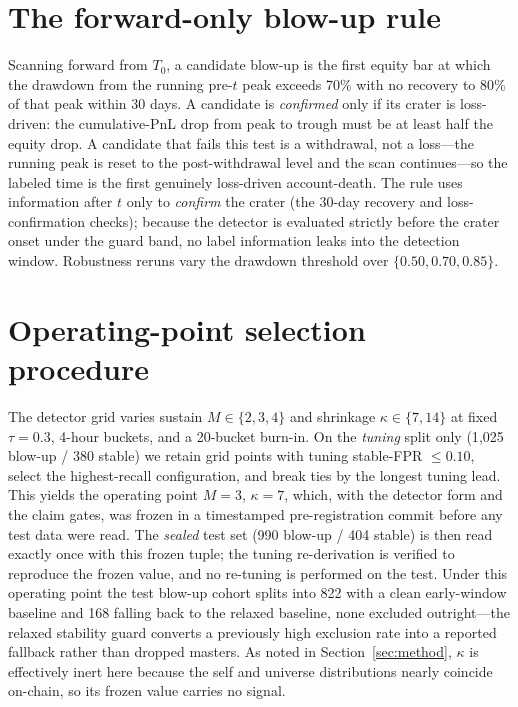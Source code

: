 \documentclass[11pt,a4paper]{article}
\newcommand{\Tnull}{T_{0}}
\begin{document}
\section{The forward-only blow-up rule}
\label{app:rule}

Scanning forward from $\Tnull$, a candidate blow-up is the first equity bar at which
the drawdown from the running pre-$t$ peak exceeds 70\% with no recovery to 80\% of
that peak within 30 days. A candidate is \emph{confirmed} only if its crater is
loss-driven: the cumulative-PnL drop from peak to trough must be at least half the
equity drop. A candidate that fails this test is a withdrawal, not a loss---the
running peak is reset to the post-withdrawal level and the scan continues---so the
labeled time is the first genuinely loss-driven account-death. The rule uses
information after $t$ only to \emph{confirm} the crater (the 30-day recovery and
loss-confirmation checks); because the detector is evaluated strictly before the
crater onset under the guard band, no label information leaks into the detection
window. Robustness reruns vary the drawdown threshold over $\{0.50, 0.70, 0.85\}$.

\section{Operating-point selection procedure}
\label{app:op}

The detector grid varies sustain $M \in \{2,3,4\}$ and shrinkage
$\kappa \in \{7,14\}$ at fixed $\tau = 0.3$, 4-hour buckets, and a 20-bucket
burn-in. On the \emph{tuning} split only (1{,}025 blow-up / 380 stable) we retain
grid points with tuning stable-FPR $\leq 0.10$, select the highest-recall
configuration, and break ties by the longest tuning lead. This yields the operating
point $M=3$, $\kappa=7$, which, with the detector form and the claim gates, was
frozen in a timestamped pre-registration commit before any test data were read. The
\emph{sealed} test set (990 blow-up / 404 stable) is then read exactly once with this
frozen tuple; the tuning re-derivation is verified to reproduce the frozen value, and
no re-tuning is performed on the test. Under this operating point the test blow-up
cohort splits into 822 with a clean early-window baseline and 168 falling back to the
relaxed baseline, none excluded outright---the relaxed stability guard converts a
previously high exclusion rate into a reported fallback rather than dropped masters.
As noted in Section~\ref{sec:method}, $\kappa$ is effectively inert here because the
self and universe distributions nearly coincide on-chain, so its frozen value carries
no signal.



\end{document}
